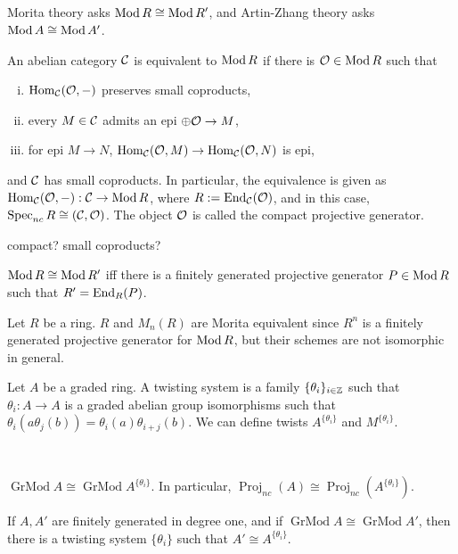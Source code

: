 \documentclass{../../../small}
\newcommand{\GrMod}{\operatorname{GrMod}}
\newcommand{\Proj}{\operatorname{Proj}}
\begin{document}
\subsection{}
Morita theory asks $\operatorname{Mod} R\cong\operatorname{Mod} R'$, and Artin-Zhang theory asks $\operatorname{Mod} A\cong\operatorname{Mod} A'$.
\begin{thm}
An abelian category $\mathcal{C}$ is equivalent to $\operatorname{Mod} R$ if there is $\mathcal{O}\in\operatorname{Mod} R$ such that
\begin{enumerate}[(i)]
\item $\operatorname{Hom}_{\mathcal{C}}(\mathcal{O},-)$ preserves small coproducts,
\item every $M\in\mathcal{C}$ admits an epi $\oplus\mathcal{O}\to M$,
\item for epi $M\to N$, $\operatorname{Hom}_{\mathcal{C}}(\mathcal{O},M)\to\operatorname{Hom}_{\mathcal{C}}(\mathcal{O},N)$ is epi,
\end{enumerate}
and $\mathcal{C}$ has small coproducts.
In particular, the equivalence is given as $\operatorname{Hom}_{\mathcal{C}}(\mathcal{O},-):\mathcal{C}\to\operatorname{Mod} R$, where $R:=\operatorname{End}_{\mathcal{C}}(\mathcal{O})$, and in this case, $\operatorname{Spec}_{nc}R\cong(\mathcal{C},\mathcal{O})$.
The object $\mathcal{O}$ is called the compact projective generator.
\end{thm}
compact? small coproducts?
\begin{cor}
$\operatorname{Mod} R\cong\operatorname{Mod} R'$ iff there is a finitely generated projective generator $P\in\operatorname{Mod} R$ such that $R'=\operatorname{End}_R(P)$.
\end{cor}
\begin{ex}
Let $R$ be a ring.
$R$ and $M_n(R)$ are Morita equivalent since $R^n$ is a finitely generated projective generator for $\operatorname{Mod} R$, but their schemes are not isomorphic in general.
\end{ex}


\begin{defn}
Let $A$ be a graded ring.
A twisting system is a family $\{\theta_i\}_{i\in\mathbb{Z}}$ such that $\theta_i:A\to A$ is a graded abelian group isomorphisms such that $\theta_i(a\theta_j(b))=\theta_i(a)\theta_{i+j}(b)$.
We can define twists $A^{\{\theta_i\}}$ and $M^{\{\theta_i\}}$.
\end{defn}
\begin{thm}[Zhang]\,
\begin{parts}
\item $\GrMod A\cong\GrMod A^{\{\theta_i\}}$. In particular, $\Proj_{nc}(A)\cong\Proj_{nc}(A^{\{\theta_i\}})$.
\item If $A,A'$ are finitely generated in degree one, and if $\GrMod A\cong\GrMod A'$, then there is a twisting system $\{\theta_i\}$ such that $A'\cong A^{\{\theta_i\}}$.
\end{parts}
\end{thm}
\end{document}
